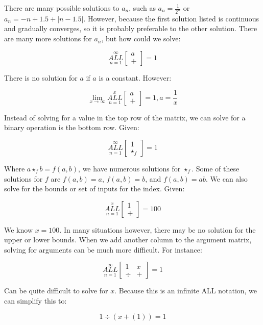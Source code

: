 \documentclass{article}
\begin{document}
There are many possible solutions to $a_n$, such as $a_n = \frac{1}{2^n}$ or $a_n = -n+1.5+|n-1.5|$. However, because the first solution listed is continuous and gradually converges, so it is probably preferable to the other solution. There are many more solutions for $a_n$, but how could we solve:

$$\underset{n=1}{\overset{\infty}{ALL}} \begin{bmatrix}
a \\
+
\end{bmatrix} = 1$$

There is no solution for $a$ if $a$ is a constant. However:

$$\underset{x \rightarrow \infty}{\lim} \underset{n=1}{\overset{x}{ALL}} \begin{bmatrix}
a \\
+
\end{bmatrix} = 1, a = \frac{1}{x}$$

Instead of solving for a value in the top row of the matrix, we can solve for a binary operation is the bottom row. Given:

$$\underset{n=1}{\overset{\infty}{ALL}} \begin{bmatrix}
1 \\
\star_f
\end{bmatrix} = 1$$

Where $a \star_f b = f(a,b)$, we have numerous solutions for $\star_f$. Some of these solutions for $f$ are $f(a,b)=a$, $f(a,b)=b$, and $f(a,b)=ab$. We can also solve for the bounds or set of inputs for the index. Given:

$$\underset{n=1}{\overset{x}{ALL}} \begin{bmatrix}
1 \\
+
\end{bmatrix} = 100$$

We know $x=100$. In many situations however, there may be no solution for the upper or lower bounds. When we add another column to the argument matrix, solving for arguments can be much more difficult. For instance:

$$\underset{n=1}{\overset{\infty}{ALL}} \begin{bmatrix}
1 & x \\
\div & +
\end{bmatrix} = 1$$

Can be quite difficult to solve for $x$. Because this is an infinite ALL notation, we can simplify this to:

$$1 \div (x + (1)) = 1$$
\end{document}
